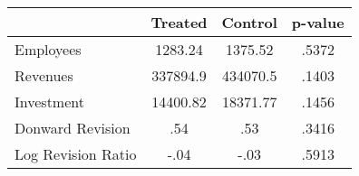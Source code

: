 \begin{tabular}{l*{3}{c}}
\toprule
                    &     Treated&     Control&     p-value\\
\midrule
Employees           &     1283.24&     1375.52&       .5372\\
Revenues            &    337894.9&    434070.5&       .1403\\
Investment          &    14400.82&    18371.77&       .1456\\
Donward Revision    &         .54&         .53&       .3416\\
Log Revision Ratio  &        -.04&        -.03&       .5913\\
\bottomrule
\end{tabular}
